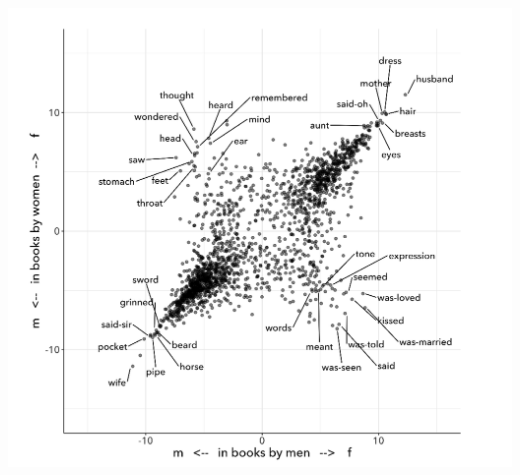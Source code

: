 \documentclass[11pt]{article}
\begin{document}
\begin{center}
\includegraphics[width=.9\linewidth]{./img/Underwood.png}
\end{center}
\end{document}

